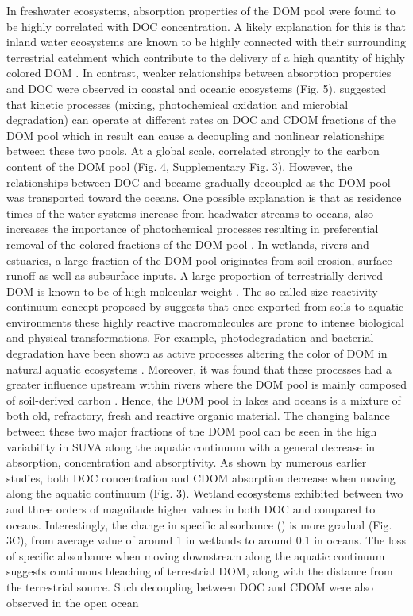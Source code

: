 In freshwater ecosystems, absorption properties of the DOM pool were found to be highly correlated with DOC concentration. A likely explanation for this is that inland water ecosystems are known to be highly connected with their surrounding terrestrial catchment \citep{Wiens2002, Frenette2012} which contribute to the delivery of a high quantity of highly colored DOM \citep{Massicotte2011EA, Lambert2016, Cole2007}. In contrast, weaker relationships between absorption properties and DOC were observed in coastal and oceanic ecosystems (Fig. 5). \citet{Stedmon2015b} suggested that kinetic processes (mixing, photochemical oxidation and microbial degradation) can operate at different rates on DOC and CDOM fractions of the DOM pool which in result can cause a decoupling and nonlinear relationships between these two pools. At a global scale,  correlated strongly to the carbon content of the DOM pool (Fig. 4, Supplementary Fig. 3). However, the relationships between DOC and  became gradually decoupled as the DOM pool was transported toward the oceans. One possible explanation is that as residence times of the water systems increase from headwater streams to oceans,  also increases the importance of photochemical processes resulting in preferential removal of the colored fractions of the DOM pool \citep{Vahatalo2004, Moran2000, Bittar2015, Hansen2016, Weyhenmeyer2012}. In wetlands, rivers and estuaries, a large fraction of the DOM pool originates  from soil erosion, surface runoff \citep{Massicotte2011EA, Lambert2015a} as well as subsurface inputs. A large proportion of terrestrially-derived DOM is known to be of high molecular weight \citep{Heinz2015}. The so-called size-reactivity continuum concept proposed by \cite{Amon1996} suggests that once exported from soils to aquatic environments these highly reactive macromolecules are prone to intense biological and physical transformations. For example, photodegradation and bacterial degradation have been shown as active processes altering the color of DOM in natural aquatic ecosystems \citep{Moran2000, Helms2014}. Moreover, it was found that these processes had a greater influence upstream within rivers where the DOM pool is mainly composed of soil-derived carbon \citep{Weyhenmeyer2012, Seidel2015}. Hence, the DOM pool in lakes and oceans is a mixture of both old, refractory, fresh and reactive organic material. The changing balance between these two major fractions of the DOM pool can be seen in the high variability in SUVA along the aquatic continuum with a general decrease in absorption, concentration and absorptivity. As shown by numerous earlier studies, both DOC concentration and CDOM absorption decrease when moving along the aquatic continuum (Fig. 3). Wetland ecosystems exhibited between two and three orders of magnitude higher values in both DOC and  compared to oceans. Interestingly, the change in specific absorbance () is more gradual (Fig. 3C), from average value of around 1 in wetlands to around 0.1 \suvagram in oceans. The loss of specific absorbance when moving downstream along the aquatic continuum suggests continuous bleaching of terrestrial DOM, along with the distance from the terrestrial source. Such decoupling between DOC and CDOM were also observed in the open ocean 